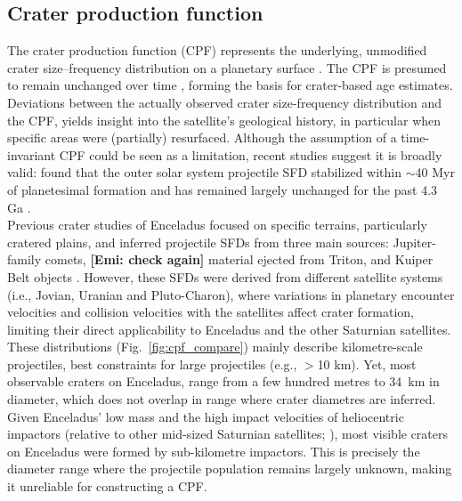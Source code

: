 \documentclass[preprint,11pt,3p,times,authoryear]{elsarticle}
\begin{document}
\subsection{Crater production function}
\label{sub:intro_cpf}
The crater production function (CPF) represents the underlying, unmodified crater size–frequency distribution on a planetary surface \citep{Neukum1975}. The CPF is presumed to remain unchanged over time \citep{Neukum1975,Neukum1983,Werner2014,Werner2023}, forming the basis for crater-based age estimates. Deviations between the actually observed crater size-frequency distribution and the CPF, yields insight into the satellite's geological history, in particular when specific areas were (partially) resurfaced. Although the assumption of a time-invariant CPF could be seen as a limitation, recent studies suggest it is broadly valid: \citet{Bottke2024} found that the outer solar system projectile SFD stabilized within $\sim$40 Myr of planetesimal formation and has remained largely unchanged for the past 4.3 Ga \citep{Bottke2024}.\\

Previous crater studies of Enceladus focused on specific terrains, particularly cratered plains, and inferred projectile SFDs from three main sources:
Jupiter-family comets,
\textbf{[Emi: check again]} material ejected from Triton, %
and Kuiper Belt objects \citep{Zahnle2003, Singer2019, Bottke2024}.
However, these SFDs were derived from different satellite systems (i.e., Jovian, Uranian and Pluto-Charon), where variations in planetary encounter velocities and collision velocities with the satellites affect crater formation, limiting their direct applicability to Enceladus and the other Saturnian satellites. \\

These distributions (Fig.~\ref{fig:cpf_compare}) mainly describe kilometre-scale projectiles, best constraints for large projectiles (e.g., $>$10 km). Yet, most observable craters on Enceladus, range from a few hundred metres to 34~km in diameter, which does not overlap in range where crater diametres are inferred. Given Enceladus’ low mass and the high impact velocities of heliocentric impactors (relative to other mid-sized Saturnian satellites; \citealt{Zahnle2003, Wong2021}), most visible craters on Enceladus were formed by sub-kilometre impactors. This is precisely the diameter range where the projectile population remains largely unknown, making it unreliable for constructing a CPF. \\
\end{document}
